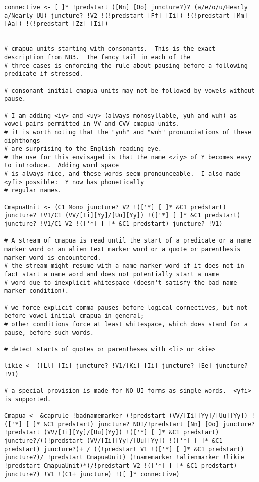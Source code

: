 \documentclass[12pt]{book}
\begin{document}
{\begin{verbatim}
connective <- [ ]* !predstart ([Nn] [Oo] juncture?)? (a/e/o/u/Hearly a/Nearly UU) juncture? !V2 !(!predstart [Ff] [Ii]) !(!predstart [Mm] [Aa]) !(!predstart [Zz] [Ii])


# cmapua units starting with consonants.  This is the exact description from NB3.  The fancy tail in each of the 
# three cases is enforcing the rule about pausing before a following predicate if stressed.

# consonant initial cmapua units may not be followed by vowels without pause.

# I am adding <iy> and <uy> (always monosyllable, yuh and wuh) as vowel pairs permitted in VV and CVV cmapua units.
# it is worth noting that the "yuh" and "wuh" pronunciations of these diphthongs
# are surprising to the English-reading eye.
# The use for this envisaged is that the name <ziy> of Y becomes easy to introduce.  Adding word space
# is always nice, and these words seem pronounceable.  I also made <yfi> possible:  Y now has phonetically
# regular names.

CmapuaUnit <- (C1 Mono juncture? V2 !(['*] [ ]* &C1 predstart) juncture? !V1/C1 (VV/[Ii][Yy]/[Uu][Yy]) !(['*] [ ]* &C1 predstart) juncture? !V1/C1 V2 !(['*] [ ]* &C1 predstart) juncture? !V1) 

# A stream of cmapua is read until the start of a predicate or a name marker word or an alien text marker word or a quote or parenthesis marker word is encountered.
# the stream might resume with a name marker word if it does not in fact start a name word and does not potentially start a name
# word due to inexplicit whitespace (doesn't satisfy the bad name marker condition).

# we force explicit comma pauses before logical connectives, but not before vowel initial cmapua in general;
# other conditions force at least whitespace, which does stand for a pause, before such words.

# detect starts of quotes or parentheses with <li> or <kie>

likie <- ([Ll] [Ii] juncture? !V1/[Ki] [Ii] juncture? [Ee] juncture? !V1)

# a special provision is made for NO UI forms as single words.  <yfi> is supported.

Cmapua <- &caprule !badnamemarker (!predstart (VV/[Ii][Yy]/[Uu][Yy]) !(['*] [ ]* &C1 predstart) juncture? NOI/!predstart [Nn] [Oo] juncture? !predstart (VV/[Ii][Yy]/[Uu][Yy]) !(['*] [ ]* &C1 predstart) juncture?/((!predstart (VV/[Ii][Yy]/[Uu][Yy]) !(['*] [ ]* &C1 predstart) juncture?)+ / ((!predstart V1 !(['*] [ ]* &C1 predstart) juncture?)/ !predstart CmapuaUnit) (!namemarker !alienmarker !likie !predstart CmapuaUnit)*)/!predstart V2 !(['*] [ ]* &C1 predstart) juncture?) !V1 !(C1+ juncture) !([ ]* connective)


\end{verbatim}}
\end{document}
